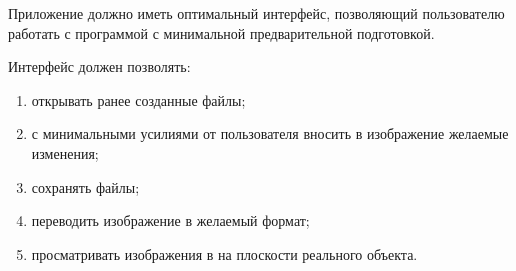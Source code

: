 Приложение должно иметь оптимальный интерфейс, позволяющий пользователю работать с программой с минимальной предварительной подготовкой. 

Интерфейс должен позволять:
\begin{enumerate}
    \item открывать ранее созданные файлы;
    \item с минимальными усилиями от пользователя вносить в изображение желаемые изменения;
    \item сохранять файлы;
    \item переводить изображение в желаемый формат;
    \item просматривать изображения в на плоскости реального объекта.
\end{enumerate}
